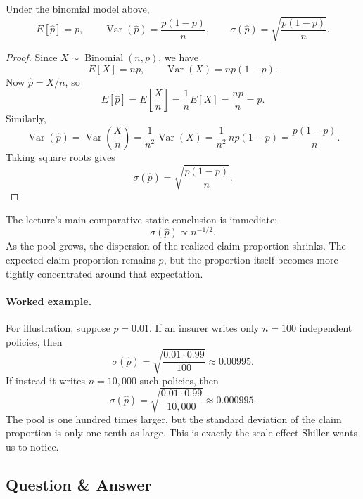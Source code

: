 \begin{proposition}
Under the binomial model above,
\begin{equation}
E[\hat p]=p, \qquad \operatorname{Var}(\hat p)=\frac{p(1-p)}{n}, \qquad \sigma(\hat p)=\sqrt{\frac{p(1-p)}{n}}.
\end{equation}
\end{proposition}

\begin{proof}
Since \(X \sim \operatorname{Binomial}(n,p)\), we have
\[
E[X]=np, \qquad \operatorname{Var}(X)=np(1-p).
\]
Now \(\hat p=X/n\), so
\[
E[\hat p]=E\!\left[\frac{X}{n}\right]=\frac{1}{n}E[X]=\frac{np}{n}=p.
\]
Similarly,
\[
\operatorname{Var}(\hat p)=\operatorname{Var}\!\left(\frac{X}{n}\right)=\frac{1}{n^2}\operatorname{Var}(X)=\frac{1}{n^2}\,np(1-p)=\frac{p(1-p)}{n}.
\]
Taking square roots gives
\[
\sigma(\hat p)=\sqrt{\frac{p(1-p)}{n}}.
\]
\end{proof}

The lecture's main comparative-static conclusion is immediate:
\begin{equation}
\sigma(\hat p)\propto n^{-1/2}.
\end{equation}
As the pool grows, the dispersion of the realized claim proportion shrinks. The expected claim proportion remains \(p\), but the proportion itself becomes more tightly concentrated around that expectation.

\paragraph{Worked example.} For illustration, suppose \(p=0.01\). If an insurer writes only \(n=100\) independent policies, then
\begin{equation}
\sigma(\hat p)=\sqrt{\frac{0.01\cdot 0.99}{100}} \approx 0.00995.
\end{equation}
If instead it writes \(n=10{,}000\) such policies, then
\begin{equation}
\sigma(\hat p)=\sqrt{\frac{0.01\cdot 0.99}{10{,}000}} \approx 0.000995.
\end{equation}
The pool is one hundred times larger, but the standard deviation of the claim proportion is only one tenth as large. This is exactly the scale effect Shiller wants us to notice.

\subsection{Question \& Answer}

